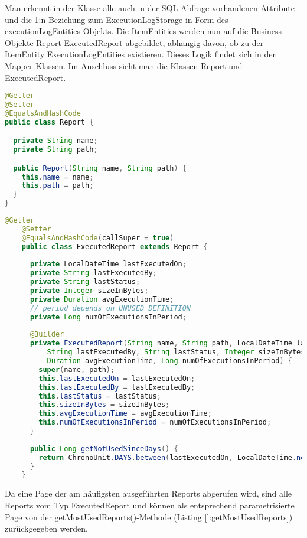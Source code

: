 Man erkennt in der Klasse alle auch in der SQL-Abfrage vorhandenen Attribute und die 1:n-Beziehung zum ExecutionLogStorage in Form des executionLogEntities-Objekts. Die ItemEntities werden nun auf die Business-Objekte Report \bzw ExecutedReport abgebildet, abhängig davon, ob zu der ItemEntity ExecutionLogEntities existieren. Dieses Logik findet sich in den Mapper-Klassen. Im Anschluss sieht man die Klassen Report und ExecutedReport.
\begin{lstlisting}[language=Java,caption={Report}]
@Getter
@Setter
@EqualsAndHashCode
public class Report {

  private String name;
  private String path;

  public Report(String name, String path) {
    this.name = name;
    this.path = path;
  }
}
\end{lstlisting}
\begin{lstlisting}[language=Java,caption={ExecutedReport}]
	@Getter
	@Setter
	@EqualsAndHashCode(callSuper = true)
	public class ExecutedReport extends Report {
	
	  private LocalDateTime lastExecutedOn;
	  private String lastExecutedBy;
	  private String lastStatus;
	  private Integer sizeInBytes;
	  private Duration avgExecutionTime;
	  // period depends on UNUSED_DEFINITION
	  private Long numOfExecutionsInPeriod;
	
	  @Builder
	  private ExecutedReport(String name, String path, LocalDateTime lastExecutedOn,
		  String lastExecutedBy, String lastStatus, Integer sizeInBytes,
		  Duration avgExecutionTime, Long numOfExecutionsInPeriod) {
		super(name, path);
		this.lastExecutedOn = lastExecutedOn;
		this.lastExecutedBy = lastExecutedBy;
		this.lastStatus = lastStatus;
		this.sizeInBytes = sizeInBytes;
		this.avgExecutionTime = avgExecutionTime;
		this.numOfExecutionsInPeriod = numOfExecutionsInPeriod;
	  }
	
	  public Long getNotUsedSinceDays() {
		return ChronoUnit.DAYS.between(lastExecutedOn, LocalDateTime.now());
	  }
	}
\end{lstlisting}
Da eine Page der am häufigsten ausgeführten Reports abgerufen wird, sind alle Reports vom Typ ExecutedReport und können als entsprechend parametrisierte Page von der getMostUsedReports()-Methode (Listing \ref{l:getMostUsedReports}) zurückgegeben werden.

